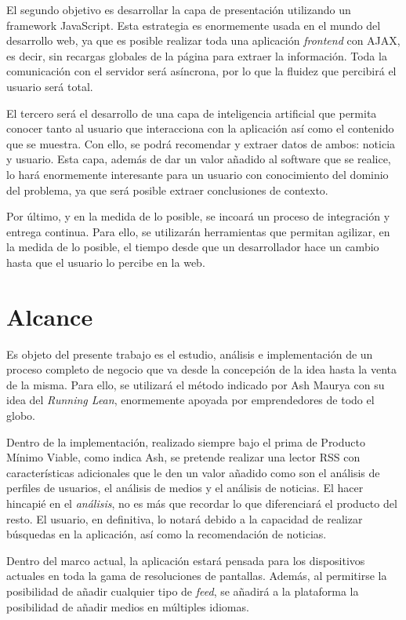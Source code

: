 El segundo objetivo es desarrollar la capa de presentación utilizando un framework JavaScript. Esta estrategia es enormemente usada en el mundo del desarrollo web, ya que es posible realizar toda una aplicación \textit{frontend} con AJAX, es decir, sin recargas globales de la página para extraer la información. Toda la comunicación con el servidor será asíncrona, por lo que la fluidez que percibirá el usuario será total.

El tercero será el desarrollo de una capa de inteligencia artificial que permita conocer tanto al usuario que interacciona con la aplicación así como el contenido que se muestra. Con ello, se podrá recomendar y extraer datos de ambos: noticia y usuario. Esta capa, además de dar un valor añadido al software que se realice, lo hará enormemente interesante para un usuario con conocimiento del dominio del problema, ya que será posible extraer conclusiones de contexto.

Por último, y en la medida de lo posible, se incoará un proceso de integración y entrega continua. Para ello, se utilizarán herramientas que permitan agilizar, en la medida de lo posible, el tiempo desde que un desarrollador hace un cambio hasta que el usuario lo percibe en la web.


\section{Alcance}\label{sec:alcance}

Es objeto del presente trabajo es el estudio, análisis e implementación de un proceso completo de negocio que va desde la concepción de la idea hasta la venta de la misma. Para ello, se utilizará el método indicado por Ash Maurya con su idea del \textit{Running Lean}, enormemente apoyada por emprendedores de todo el globo.

Dentro de la implementación, realizado siempre bajo el prima de Producto Mínimo Viable, como indica Ash, se pretende realizar una lector RSS con características adicionales que le den un valor añadido como son el análisis de perfiles de usuarios, el análisis de medios y el análisis de noticias. El hacer hincapié en el \textit{análisis}, no es más que recordar lo que diferenciará el producto del resto. El usuario, en definitiva, lo notará debido a la capacidad de realizar búsquedas en la aplicación, así como la recomendación de noticias.

Dentro del marco actual, la aplicación estará pensada para los dispositivos actuales en toda la gama de resoluciones de pantallas. Además, al permitirse la posibilidad de añadir cualquier tipo de \textit{feed}, se añadirá a la plataforma la posibilidad de añadir medios en múltiples idiomas.


